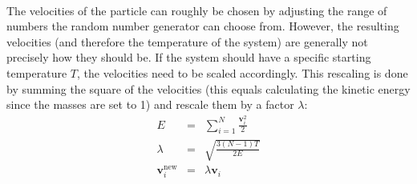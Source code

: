 \documentclass[12pt]{article}
\begin{document}
\\The velocities of the particle can roughly be chosen by adjusting the range of numbers the random number generator can choose from. However, the
resulting velocities (and therefore the temperature of the system) are generally not precisely how they should be. If the system should have a
specific starting temperature $T$, the velocities need to be scaled accordingly. This rescaling is done by summing the square of the velocities
(this equals calculating the kinetic energy since the masses are set to 1) and rescale them by a factor $\lambda$:
\begin{eqnarray}
\label{eq:rescale1}   E &=& \sum_{i=1}^N \frac{\mathbf{v}_i^2}{2} \\
 \label{eq:rescale2}   \lambda &=& \sqrt{\frac{3(N-1)T}{2E}} \\
 \label{eq:rescale3}   \mathbf{v}_i^\text{new} &=& \lambda \mathbf{v}_i  
\end{eqnarray}
\end{document}
